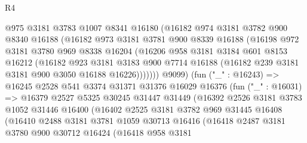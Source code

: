 \begin{lexlean}{R4}
\begin{coremodule}
                  @975
                  @3181
                  @3783
                  @1007
                  @8341
                  @16180
                  (@16182
                    @974
                    @3181
                    @3782
                    @900
                    @8340
                    @16188
                    (@16182
                      @973
                      @3181
                      @3781
                      @900
                      @8339
                      @16188
                      (@16198
                        @972
                        @3181
                        @3780
                        @969
                        @8338
                        @16204
                        (@16206
                          @958
                          @3181
                          @3184
                          @601
                          @8153
                          @16212
                          (@16182
                            @923
                            @3181
                            @3183
                            @900
                            @7714
                            @16188
                            (@16182 @239 @3181 @3181 @900 @3050 @16188 @16226)))))))
                @9099)
              (fun ("_" : @16243) =>
              @16245
                @2528
                @541
                @3374
                @31371
                @31376
                @16029
                @16376
                (fun ("_" : @16031) =>
                @16379
                  @2527
                  @5325
                  @30245
                  @31447
                  @31449
                  (@16392
                    @2526
                    @3181
                    @3783
                    @1052
                    @31446
                    @16400
                    (@16402
                      @2525
                      @3181
                      @3782
                      @969
                      @31445
                      @16408
                      (@16410
                        @2488
                        @3181
                        @3781
                        @1059
                        @30713
                        @16416
                        (@16418
                          @2487
                          @3181
                          @3780
                          @900
                          @30712
                          @16424
                          (@16418
                            @958
                            @3181

\end{coremodule}
\end{lexlean}
